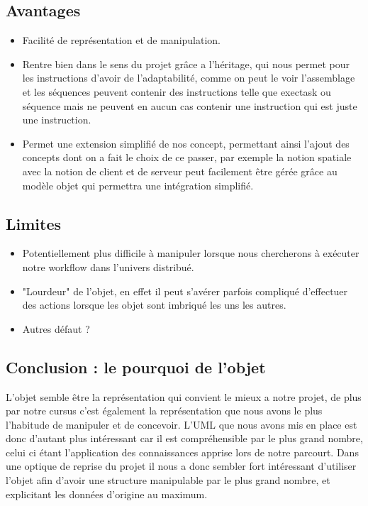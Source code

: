 \documentclass{article}
\begin{document}
\subsection{Avantages}
\begin{itemize}
    \item Facilité de représentation et de manipulation.
    \item Rentre bien dans le sens du projet grâce a l'héritage, qui nous permet pour les instructions d'avoir de l'adaptabilité, comme on peut le voir l'assemblage et les séquences peuvent contenir des instructions telle que exectask ou séquence mais ne peuvent en aucun cas contenir une instruction qui est juste une instruction.
    \item Permet une extension simplifié de nos concept, permettant ainsi l'ajout des concepts dont on a fait le choix de ce passer, par exemple la notion spatiale avec la notion de client et de serveur peut facilement être gérée grâce au modèle objet qui permettra une intégration simplifié.
\end{itemize}

\subsection{Limites}
\begin{itemize}
    \item Potentiellement plus difficile à manipuler lorsque nous chercherons à exécuter notre workflow dans l'univers distribué.
    \item "Lourdeur" de l'objet, en effet il peut s'avérer parfois compliqué d'effectuer des actions lorsque les objet sont imbriqué les uns les autres.
    \item Autres défaut ?
\end{itemize}

\subsection{Conclusion : le pourquoi de l'objet}
L'objet semble être la représentation qui convient le mieux a notre projet, de plus par notre cursus c'est également la représentation que nous avons le plus l'habitude de manipuler et de concevoir. L'UML que nous avons mis en place est donc d'autant plus intéressant car il est compréhensible par le plus grand nombre, celui ci étant l'application des connaissances apprise lors de notre parcourt. Dans une optique de reprise du projet il nous a donc sembler fort intéressant d'utiliser l'objet afin d'avoir une structure manipulable par le plus grand nombre, et explicitant les données d'origine au maximum.
\end{document}
